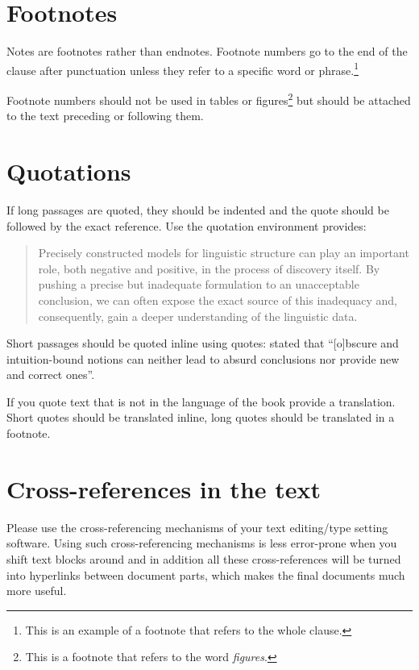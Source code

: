 \section{Footnotes}

Notes are footnotes rather than endnotes. Footnote numbers go to the end of the clause after punctuation
unless they refer to a specific word or phrase.\footnote{
  This is an example of a footnote that refers to the whole clause.
}

Footnote numbers should not be used in tables or figures\footnote{
  This is a footnote that refers to the word \emph{figures}. 
} but should be attached to the text preceding or following them.



\section{Quotations}

If long passages are quoted, they should be indented and the quote should be followed by the exact reference. Use the quotation environment \latex provides:
\begin{quotation}
Precisely constructed models for linguistic structure can play an
important role, both negative and positive, in the process of discovery 
itself. By pushing a precise but inadequate formulation to
an unacceptable conclusion, we can often expose the exact source
of this inadequacy and, consequently, gain a deeper understanding
of the linguistic data.
\citep[5]{Chomsky57a}
\end{quotation}
%
Short passages should be quoted inline using quotes: \citet[5]{Chomsky57a} stated that ``[o]bscure
  and intuition-bound notions can neither lead to absurd conclusions nor provide new and
correct ones''.

If you quote text that is not in the language of the book provide a translation. Short quotes should
be translated inline, long quotes should be translated in a footnote.

\section{Cross-references in the text}

Please use the cross-referencing mechanisms of your text editing/type setting software. Using such
cross-referencing mechanisms is less error-prone when you shift text blocks around and in addition
all these cross-references will be turned into hyperlinks between document parts, which makes the
final documents much more useful.

